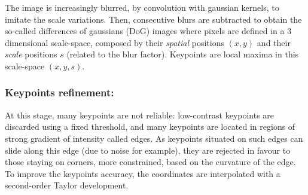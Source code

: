 \documentclass[preprint]{iucr}
\begin{document}
The image is increasingly blurred, by convolution with gaussian kernels, to
imitate the scale variations.
Then, consecutive blurs are subtracted to obtain the so-called differences of
gaussians (DoG) images where pixels are defined in a 3 dimensional
scale-space, composed by  their \emph{spatial} positions $(x, y)$ and their
\emph{scale} positions $s$ (related to the blur factor). Keypoints are
local maxima in this scale-space $(x, y, s)$.



\subsubsection{Keypoints refinement:}

At this stage, many keypoints are not reliable: low-contrast keypoints are
discarded using a fixed threshold, and many keypoints are located in regions of
strong gradient of intensity called edges. As keypoints situated on such edges
can slide along this edge (due to noise for example), they are rejected in
favour to those staying on corners, more constrained, based on the curvature
of the edge.
To improve the keypoints accuracy, the coordinates are interpolated with a
second-order Taylor development.
\end{document}
